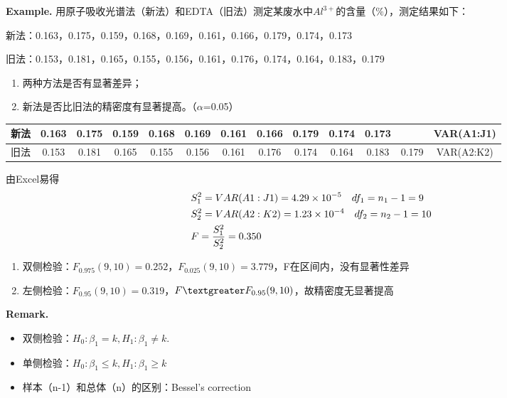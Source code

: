 \documentclass[UTF8]{ctexart}
\begin{document}
\textbf{Example.}
用原子吸收光谱法（新法）和EDTA（旧法）测定某废水中$Al^{3+}$的含量（$\%$），测定结果如下：
\par 新法：0.163，0.175，0.159，0.168，0.169，0.161，0.166，0.179，0.174，0.173
\par 旧法：0.153，0.181，0.165，0.155，0.156，0.161，0.176，0.174，0.164，0.183，0.179
\begin{enumerate}[（1）]
\item 两种方法是否有显著差异；
\item 新法是否比旧法的精密度有显著提高。（$\alpha$=0.05）
\end{enumerate}
\begin{center}
\begin{tabular}{ccccccccccccc}
\toprule
新法&0.163&0.175&0.159&0.168&0.169&0.161&0.166&0.179&0.174&0.173& &VAR(A1:J1) \\ 
\midrule
旧法& 0.153&0.181 &0.165  &0.155  &0.156  &0.161  &0.176  &0.174  &0.164  &0.183 &0.179& VAR(A2:K2)\\
\bottomrule
\end{tabular}
\end{center}
\par 由Excel易得
\begin{equation}\notag
  \begin{aligned}
&S_{1}^{2}=VAR(A1:J1)=4.29\times10^{-5}\quad df_{1}=n_{1}-1=9\\
&S_{2}^{2}=VAR(A2:K2)=1.23\times10^{-4}\quad df_{2}=n_{2}-1=10\\
&F=\frac{S_{1}^{2}}{S_{2}^{2}}=0.350
  \end{aligned}
\end{equation}
\begin{enumerate}[•]
\item 双侧检验：$F_{0.975}(9,10)=0.252$，$F_{0.025}(9,10)=3.779$，F在区间内，没有显著性差异
\item 左侧检验：$F_{0.95}(9,10)=0.319$，$F\textgreater F_{0.95}(9,10)$，故精密度无显著提高
\end{enumerate}

\textbf{Remark.}
\begin{itemize}
\item 双侧检验：$H_{0}:\beta_{1}=k, H_{1}:\beta_{1}\neq k$.
\item 单侧检验：$H_{0}:\beta_{1}\leqslant k, H_{1}:\beta_{1}\geqslant  k$
\item 样本（n-1）和总体（n）的区别：Bessel's correction
\end{itemize} 
\end{document}
